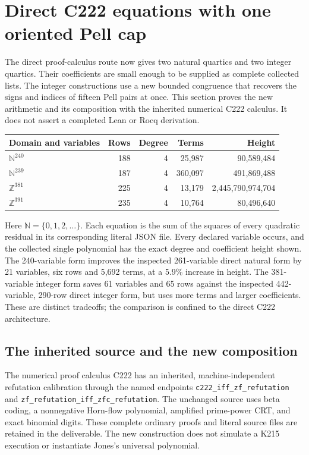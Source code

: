 \section{Direct C222 equations with one oriented Pell cap}
\label{sec:direct-cap}
\label{sec:arithmetic}

The direct proof-calculus route now gives two natural quartics and two
integer quartics.  Their coefficients are small enough to be supplied as
complete collected lists.  The integer constructions use a new bounded
congruence that recovers the signs and indices of fifteen Pell pairs at
once.  This section proves the new arithmetic and its composition with
the inherited numerical C222 calculus.  It does not assert a completed
Lean or Rocq derivation.

\begin{center}
\begin{tabular}{lrrrr}
\hline
Domain and variables & Rows & Degree & Terms & Height\\
\hline
$\mathbb N^{240}$ &188&4&25,987&90,589,484\\
$\mathbb N^{239}$ &187&4&360,097&491,869,488\\
$\mathbb Z^{381}$ &225&4&13,179&2,445,790,974,704\\
$\mathbb Z^{391}$ &235&4&10,764&80,496,640\\
\hline
\end{tabular}
\end{center}

Here $\mathbb N=\{0,1,2,\ldots\}$. Each equation is the sum of the
squares of every quadratic residual in its corresponding literal JSON
file. Every declared variable occurs, and the collected single
polynomial has the exact degree and coefficient height shown.  The
240-variable form improves the inspected 261-variable direct natural
form by 21 variables, six rows and 5,692 terms, at a 5.9\% increase in
height. The 381-variable integer form saves 61 variables and 65 rows
against the inspected 442-variable, 290-row direct integer form, but
uses more terms and larger coefficients. These are distinct tradeoffs;
the comparison is confined to the direct C222 architecture.

\subsection{The inherited source and the new composition}

The numerical proof calculus C222 has an inherited, machine-independent
refutation calibration through the named endpoints
\nolinkurl{c222_iff_zf_refutation} and
\nolinkurl{zf_refutation_iff_zfc_refutation}.  The unchanged source
uses beta coding, a nonnegative Horn-flow polynomial, amplified
prime-power CRT, and exact binomial digits.  These complete ordinary
proofs and literal source files are retained in the deliverable.
The new construction does not simulate a K215 execution or instantiate
Jones's universal polynomial.

